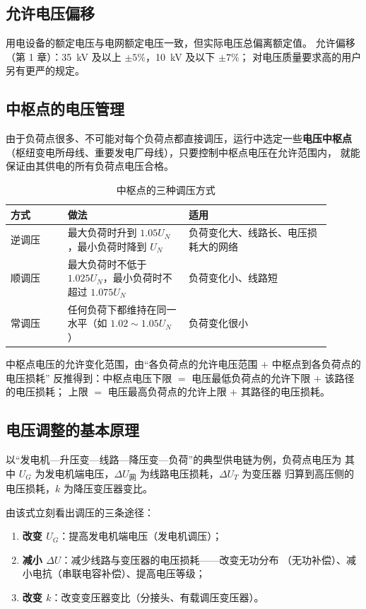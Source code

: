 \subsection{允许电压偏移}

用电设备的额定电压与电网额定电压一致，但实际电压总偏离额定值。
允许偏移（第 1 章）：35~kV 及以上 $\pm5\%$，10~kV 及以下 $\pm7\%$；
对电压质量要求高的用户另有更严的规定。

\subsection{中枢点的电压管理}

由于负荷点很多、不可能对每个负荷点都直接调压，运行中选定一些\textbf{电压中枢点}
（枢纽变电所母线、重要发电厂母线），只要控制中枢点电压在允许范围内，
就能保证由其供电的所有负荷点电压合格。

\begin{table}[htbp]
  \centering
  \caption{中枢点的三种调压方式}
  \small
  \begin{tabular}{@{}p{0.16\linewidth}p{0.34\linewidth}p{0.40\linewidth}@{}}
    \toprule
    方式 & 做法 & 适用 \\
    \midrule
    逆调压 & 最大负荷时升到 $1.05U_N$，最小负荷时降到 $U_N$ & 负荷变化大、线路长、电压损耗大的网络 \\
    顺调压 & 最大负荷时不低于 $1.025U_N$，最小负荷时不超过 $1.075U_N$ & 负荷变化小、线路短 \\
    常调压 & 任何负荷下都维持在同一水平（如 $1.02\sim1.05U_N$） & 负荷变化很小 \\
    \bottomrule
  \end{tabular}
\end{table}

中枢点电压的允许变化范围，由“各负荷点的允许电压范围 $+$ 中枢点到各负荷点的电压损耗”
反推得到：中枢点电压下限 $=$ 电压最低负荷点的允许下限 $+$ 该路径的电压损耗；
上限 $=$ 电压最高负荷点的允许上限 $+$ 其路径的电压损耗。

\subsection{电压调整的基本原理}

以“发电机—升压变—线路—降压变—负荷”的典型供电链为例，负荷点电压为
其中 $U_G$ 为发电机端电压，$\Delta U_{\text{网}}$ 为线路电压损耗，$\Delta U_T$ 为变压器
归算到高压侧的电压损耗，$k$ 为降压变压器变比。

由该式立刻看出调压的三条途径：
\begin{enumerate}
  \item \textbf{改变 $U_G$}：提高发电机端电压（发电机调压）；
  \item \textbf{减小 $\Delta U$}：减少线路与变压器的电压损耗——改变无功分布
        （无功补偿）、减小电抗（串联电容补偿）、提高电压等级；
  \item \textbf{改变 $k$}：改变变压器变比（分接头、有载调压变压器）。
\end{enumerate}

